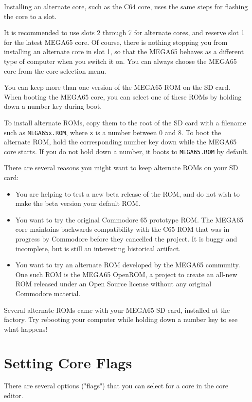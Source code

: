 Installing an alternate core, such as the C64 core, uses the same steps for flashing the core to a slot.

It is recommended to use slots 2 through 7 for alternate cores, and reserve slot 1 for the latest MEGA65 core. Of course, there is nothing stopping you from installing an alternate core in slot 1, so that the MEGA65 behaves as a different type of computer when you switch it on. You can always choose the MEGA65 core from the core selection menu.

You can keep more than one version of the MEGA65 ROM on the SD card. When booting the MEGA65 core, you can select one of these ROMs by holding down a number key during boot.

To install alternate ROMs, copy them to the root of the SD card with a filename such as {\tt MEGA65x.ROM}, where {\tt x} is a number between 0 and 8. To boot the alternate ROM, hold the corresponding number key down while the MEGA65 core starts. If you do not hold down a number, it boots to {\tt MEGA65.ROM} by default.

There are several reasons you might want to keep alternate ROMs on your SD card:

\begin{itemize}
  \item You are helping to test a new beta release of the ROM, and do not wish to make the beta version your default ROM.
  \item You want to try the original Commodore 65 prototype ROM. The MEGA65 core maintains backwards compatibility with the C65 ROM that was in progress by Commodore before they cancelled the project. It is buggy and incomplete, but is still an interesting historical artifact.
  \item You want to try an alternate ROM developed by the MEGA65 community. One such ROM is the MEGA65 OpenROM, a project to create an all-new ROM released under an Open Source license without any original Commodore material.
\end{itemize}

Several alternate ROMs came with your MEGA65 SD card, installed at the factory. Try rebooting your computer while holding down a number key to see what happens!

\section{Setting Core Flags}

There are several options ("flags") that you can select for a core in the core editor.


